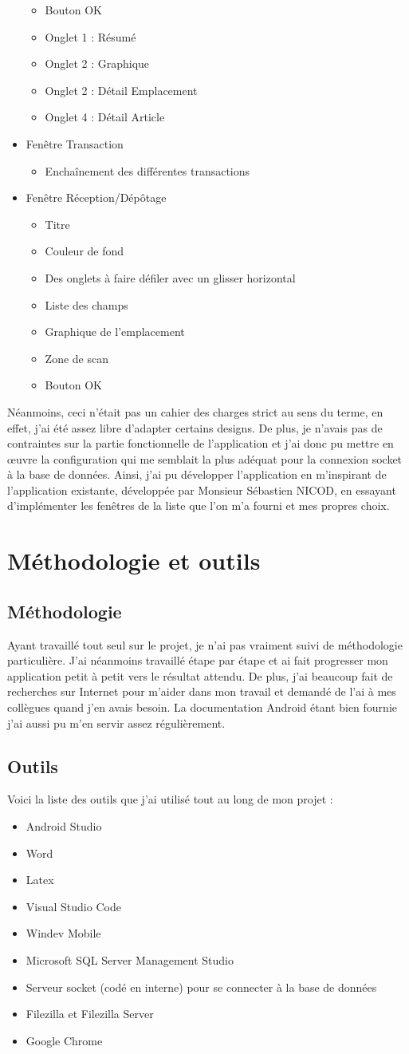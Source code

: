 \documentclass[a4paper, 12pt, french]{article}
\newcommand{\bdot}{\item[\color{ssiYellow}\ding{108}]}
\newcommand{\bdotoutlined}{\item[\color{ssiYellow}\ding{109}]}
\begin{document}
\begin{itemize}
\begin{itemize}
					\bdotoutlined{Bouton OK}
					\bdotoutlined{Onglet 1 : Résumé}
					\bdotoutlined{Onglet 2 : Graphique}
					\bdotoutlined{Onglet 2 : Détail Emplacement}
					\bdotoutlined{Onglet 4 : Détail Article}
				\end{itemize}
			\bdot{Fenêtre Transaction}
				\begin{itemize}
					\bdotoutlined{Enchaînement des différentes transactions}
				\end{itemize}
			\bdot{Fenêtre Réception/Dépôtage}
				\begin{itemize}
					\bdotoutlined{Titre}
					\bdotoutlined{Couleur de fond}
					\bdotoutlined{Des onglets à faire défiler avec un glisser horizontal}
					\bdotoutlined{Liste des champs}
					\bdotoutlined{Graphique de l'emplacement}
					\bdotoutlined{Zone de scan}
					\bdotoutlined{Bouton OK}
				\end{itemize}
		\end{itemize}
		\vspace{\baselineskip}
		Néanmoins, ceci n'était pas un cahier des charges strict au sens du terme, en effet, j'ai été assez libre d'adapter certains designs. De plus, je n'avais pas de contraintes sur la partie fonctionnelle de l'application et j'ai donc pu mettre en œuvre la configuration qui me semblait la plus adéquat pour la connexion socket à la base de données. Ainsi, j'ai pu développer l'application en m'inspirant de l'application existante, développée par Monsieur Sébastien NICOD, en essayant d'implémenter les fenêtres de la liste que l'on m'a fourni et mes propres choix.
	\newpage

	\section{Méthodologie et outils}
		\subsection{Méthodologie}
			Ayant travaillé tout seul sur le projet, je n'ai pas vraiment suivi de méthodologie particulière. J'ai néanmoins travaillé étape par étape et ai fait progresser mon application petit à petit vers le résultat attendu. De plus, j'ai beaucoup fait de recherches sur Internet pour m'aider dans mon travail et demandé de l'ai à mes collègues quand j'en avais besoin. La documentation Android étant bien fournie j'ai aussi pu m'en servir assez régulièrement.
		\subsection{Outils}
		\noindent
		Voici la liste des outils que j'ai utilisé tout au long de mon projet :
		\begin{itemize}
			\bdot{Android Studio}
			\bdot{Word}
			\bdot{Latex}
			\bdot{Visual Studio Code}
			\bdot{Windev Mobile}
			\bdot{Microsoft SQL Server Management Studio}
			\bdot{Serveur socket (codé en interne) pour se connecter à la base de données}
			\bdot{Filezilla et Filezilla Server}
			\bdot{Google Chrome}
		\end{itemize}
\end{document}
